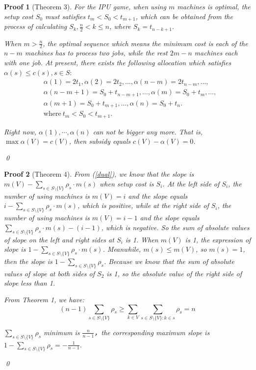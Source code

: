\documentclass[UTF8]{article}
\newtheorem{pf}{\hspace{2em}Proof}
\begin{document}
\begin{pf}[Theorem 3]
For the IPU game, when using $m$ machines is optimal, the setup cost $S_0$ must satisfies $t_m < S_0 < t_{m+1}$, which can be obtained from the process of calculating $S_k, \frac{n}{2} < k \leq n$, where $S_k = t_{n-k+1}$.

When $m > \frac{n}{2}$, the optimal sequence which means the minimum cost is each of the $n-m$ machines has to process two jobs, while the rest $2m-n$ machines each with one job. At present, there exists the following allocation which satisfies $\alpha(s) \leq c(s), s \in S:$
\[
\begin{aligned}
&\alpha(1)=2t_1,\alpha(2)=2t_2,\ldots,\alpha(n-m)=2t_{n-m},\ldots,\\
&\alpha(n-m+1)=S_0+t_{n-m+1},\ldots,\alpha(m)=S_0+t_{m},\ldots,\\
&\alpha(m+1)=S_0+t_{m+1},\ldots,\alpha(n)=S_0+t_n.\\
&\text{where} \ t_m < S_0 < t_{m+1}.
\end{aligned}
\]

Right now, $\alpha(1),\cdots,\alpha(n)$ can not be bigger any more. That is, $\mathop{max} \alpha(V) = c(V)$, then subsidy equals $c(V)-\alpha(V) = 0$.

\qed
\end{pf}


\begin{pf}[Theorem 4]
From (\ref{dual}), we know that the slope is $m(V)-\sum_{s\in S \setminus\{V\}} \rho_s \cdot m(s)$ when setup cost is $S_i$. At the left side of $S_i$, the number of using machines is $m(V)=i$ and the slope equals $i-\sum_{s\in S \setminus\{V\}} \rho_s \cdot m(s)$, which is positive, while at the right side of $S_i$, the number of using machines is $m(V)=i-1$ and the slope equals $\sum_{s\in S \setminus\{V\}} \rho_s \cdot m(s) - (i-1)$,
which is negative. So the sum of absolute values of slope on the left and right sides at $S_i$ is 1.
When $m(V)$ is 1, the expression of slope is $1-\sum_{s\in S \setminus\{V\}} \rho_s \cdot m(s)$. Meanwhile, $m(s) \leq m(V)$, so $m(s) = 1$, then the slope is $1-\sum_{s\in S \setminus\{V\}} \rho_s $.
Because we know that the sum of absolute values of slope at both sides of $S_2$ is 1, so the absolute value of the right side of slope less than 1.

From Theorem 1, we have:
\begin{displaymath}
    (n-1) \sum_{s \in S \setminus\{V\} } \rho_s \geq
    \sum_{k\in V}\sum_{s \in S \setminus\{V\}:k \in s} \rho_s = n
\end{displaymath}

$\sum_{s \in S \setminus\{V\}} \rho_s $ minimum is $\frac{n}{n-1}$，the corresponding maximum slope is $ 1-\sum_{s\in S \setminus\{V\}} \rho_s =-\frac{1}{n-1}$.

\qed
\end{pf}
\end{document}

